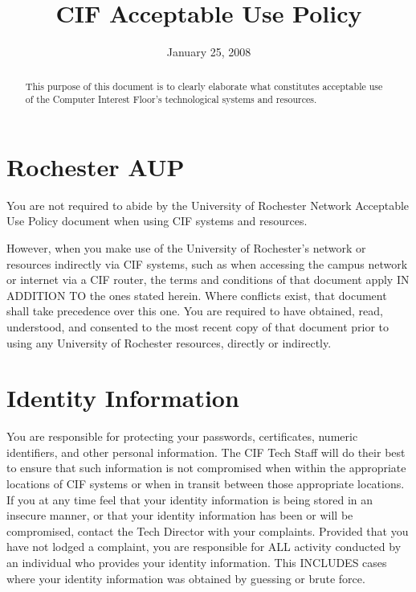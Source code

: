 \documentclass[12pt]{article}
\title{CIF Acceptable Use Policy}
\author{} %
\date{\vspace{-5ex}January 25, 2008} %
\begin{document}
\maketitle

\pagebreak

\begin{abstract}
This purpose of this document is to clearly elaborate what constitutes acceptable use of the Computer Interest Floor's technological systems and resources.
\end{abstract}

\section{Rochester AUP} %

You are not required to abide by the University of Rochester Network Acceptable Use Policy document when using CIF systems and resources.

However, when you make use of the University of Rochester's network or resources indirectly via CIF systems, such as when accessing the campus network or internet via a CIF router, the terms and conditions of that document apply IN ADDITION TO the ones stated herein. Where conflicts exist, that document shall take precedence over this one. You are required to have obtained, read, understood, and consented to the most recent copy of that document prior to using any University of Rochester resources, directly or indirectly.


\section{Identity Information} %

You are responsible for protecting your passwords, certificates, numeric identifiers, and other personal information. The CIF Tech Staff will do their best to ensure that such information is not compromised when within the appropriate locations of CIF systems or when in transit between those appropriate locations. If you at any time feel that your identity information is being stored in an insecure manner, or that your identity information has been or will be compromised, contact the Tech Director with your complaints. Provided that you have not lodged a complaint, you are responsible for ALL activity conducted by an individual who provides your identity information. This INCLUDES cases where your identity information was obtained by guessing or brute force.
\end{document}

